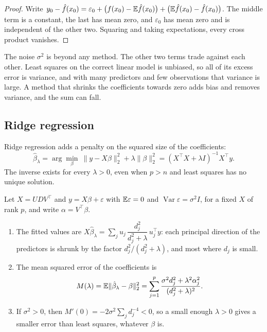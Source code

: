 \begin{chapterrefs}
\begin{proof}
Write $y_0-\hat f(x_0)=\varepsilon_0+\bigl(f(x_0)-\mathbb{E}\hat f(x_0)\bigr)+\bigl(\mathbb{E}\hat f(x_0)-\hat f(x_0)\bigr)$. The
middle term is a constant, the last has mean zero, and $\varepsilon_0$ has mean zero and is independent
of the other two. Squaring and taking expectations, every cross product vanishes.
\end{proof}

The noise $\sigma^2$ is beyond any method. The other two terms trade against each other. Least
squares on the correct linear model is unbiased, so all of its excess error is variance, and with many
predictors and few observations that variance is large. A method that shrinks the coefficients towards
zero adds bias and removes variance, and the sum can fall.

\subsection{Ridge regression}

Ridge regression \parencite{hoerl1970} adds a penalty on the squared size of the coefficients:
\begin{equation}\label{eq12:ridge}
  \hat\beta_\lambda=\arg\min_\beta\ \|y-X\beta\|_2^2+\lambda\|\beta\|_2^2=(X^\top X+\lambda I)^{-1}X^\top y .
\end{equation}
The inverse exists for every $\lambda>0$, even when $p>n$ and least squares has no unique solution.

\begin{proposition}\label{prop12:ridge}
Let $X=UDV^\top$ and $y=X\beta+\varepsilon$ with $\mathbb{E}\varepsilon=0$ and $\operatorname{Var}\varepsilon=\sigma^2I$,
for a fixed $X$ of rank $p$, and write $\alpha=V^\top\beta$.
\begin{enumerate}[label=(\roman*)]
\item The fitted values are $X\hat\beta_\lambda=\sum_j u_j\,\dfrac{d_j^2}{d_j^2+\lambda}\,u_j^\top y$: each principal
direction of the predictors is shrunk by the factor $d_j^2/(d_j^2+\lambda)$, and most where $d_j$ is small.
\item The mean squared error of the coefficients is
\begin{equation}\label{eq12:ridgemse}
  M(\lambda)=\mathbb{E}\|\hat\beta_\lambda-\beta\|_2^2=\sum_{j=1}^p\frac{\sigma^2d_j^2+\lambda^2\alpha_j^2}{(d_j^2+\lambda)^2}.
\end{equation}
\item If $\sigma^2>0$, then $M'(0)=-2\sigma^2\sum_jd_j^{-4}<0$, so a small enough $\lambda>0$ gives a smaller
error than least squares, whatever $\beta$ is.
\end{enumerate}
\end{proposition}


\end{chapterrefs}
